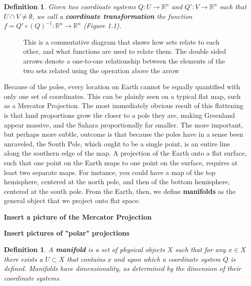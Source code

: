 \documentclass{book}
\newtheorem{defn}[equation]{Definition}
\begin{document}
\begin{defn}
	Given two coordinate systems  $Q : U \to \mathbb{R}^n$ and $Q' : V \to \mathbb{R}^n$ such that $U \cap V \neq \emptyset$, we call a \textbf{coordinate transformation} the function $f = Q' \circ (Q)^{-1} : \mathbb{R}^n \to \mathbb{R}^n$ (Figure 1.1).
\end{defn}




\begin{figure}
\begin{center}
\end{center}
\caption{This is a commutative diagram that shows how sets relate to each other, and what functions are used to relate them. The double sided arrows denote a one-to-one relationship between the elements of the two sets related using the operation above the arrow}
\end{figure}


Because of the poles, every location on Earth cannot be equally quantified with only one set of coordinates. This can be plainly seen on a typical flat map, such as a Mercator Projection. The most immediately obvious result of this flattening is that land proportions grow the closer to a pole they are, making Greenland appear massive, and the Sahara proportionally far smaller. The more important, but perhaps more subtle, outcome is that because the poles have in a sense been unraveled, the South Pole, which ought to be a single point, is an entire line along the southern edge of the map. A projection of the Earth onto a flat surface, such that one point on the Earth maps to one point on the surface, requires at least two separate maps. For instance, you could have a map of the top hemisphere, centered at the north pole, and then of the bottom hemisphere, centered at the south pole. From the Earth, then, we define \textbf{manifolds} as the general object that we project onto flat space. 


\textbf{Insert a picture of the Mercator Projection}

\textbf{Insert pictures of "polar" projections}

\begin{defn}
	A \textbf{manifold} is a set of physical objects $X$ such that for any $x \in X$ there exists a $U \subset X$ that contains $x$ and upon which a coordinate system $Q$ is defined. Manifolds have dimensionality, as determined by the dimension of their coordinate systems.
\end{defn}
\end{document}
